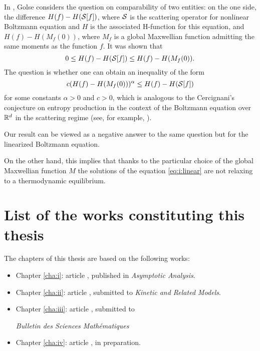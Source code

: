 In \cite{Golse2015Dispersion}, Golse considers the question on comparability of two entities: on the one side, the difference $H(f)-H(\mathcal S [f])$, where $\mathcal S$ is the scattering operator for nonlinear Boltzmann equation and $H$ is the associated H-function for this equation, and $H(f)-H(M_f(0))$, where $M_f$ is a global Maxwellian function admitting the same moments as the function $f$. It was shown that
\[0\le H(f)-H(\mathcal S[f])\le H(f)-H(M_f(0)).\]
The question is whether one can obtain an inequality of the form 
\[c(H(f)-H(M_f(0)))^\alpha\le H(f)-H(\mathcal S[f]) \]
for some constants $\alpha>0$ and $c>0$, which is analogous to the Cercignani's conjecture on entropy production in the context of the Boltzmann equation over ${\mathbb R^d}$ in the scattering regime (see, for example, \cite{Villani2008Entropy}).

Our result can be viewed as a negative answer to the same question but for the linearized Boltzmann equation.

On the other hand, this implies that thanks to the particular choice of the global Maxwellian function $M$ the solutions of the equation \eqref{eq:i:linear} are not relaxing to a thermodynamic equilibrium.


\section{List of the works constituting this thesis} %
\label{sec:list_of_the_works_constituting_this_thesis}
The chapters of this thesis are based on the following works:
\begin{itemize}
	\item Chapter \ref{cha:i}: article \cite{Zakrevskiy2015Euler}, published in \textit{Asymptotic Analysis}.
	\item Chapter \ref{cha:ii}: article \cite{Zakrevskiy2015NavierStokes}, submitted to \textit{Kinetic and Related Models}.
	\item Chapter \ref{cha:iii}: article \cite{Zakrevskiy2015Incompressible}, submitted to \begin{otherlanguage}{french}
		\textit{Bulletin des Sciences Mathématiques}
	\end{otherlanguage}
	\item Chapter \ref{cha:iv}: article \cite{Zakrevskiy2015Global}, in preparation.
\end{itemize}
  


\renewcommand{\theequation}{\thechapter.\thesection.\arabic{equation}}

